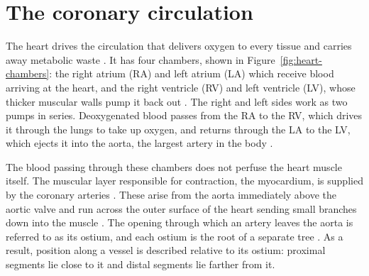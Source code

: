 
\section{The coronary circulation}
\label{sec:circulation}

The heart drives the circulation that delivers oxygen to every tissue and carries away metabolic
waste \cite{shah2009heart}.
It has four chambers, shown in Figure~\ref{fig:heart-chambers}: the right atrium (RA) and left atrium (LA) which receive
blood arriving at the heart, and the right ventricle (RV) and left ventricle (LV),
whose thicker muscular walls pump it back out \cite{weinhaus2024anatomy}. The right and left sides work as two pumps in series. Deoxygenated blood passes from the RA to the RV, which drives it
through the lungs to take up oxygen, and returns through the LA to the LV, which ejects it into
the aorta, the largest artery in the body \cite{weinhaus2024anatomy}.

The blood passing through these chambers does not perfuse the heart muscle itself.
The muscular layer responsible for contraction, the myocardium, is
supplied by the coronary arteries \cite{devos2024coronary}.
These arise from the aorta immediately above the aortic valve and run across the outer surface of
the heart sending small branches down into the muscle
\cite{devos2024coronary}.
The opening through which an artery leaves the aorta is referred to as its ostium, and each
ostium is the root of a separate tree \cite{devos2024coronary}.
As a result, position along a vessel is described relative to its ostium: proximal segments lie
close to it and distal segments lie farther from it.



